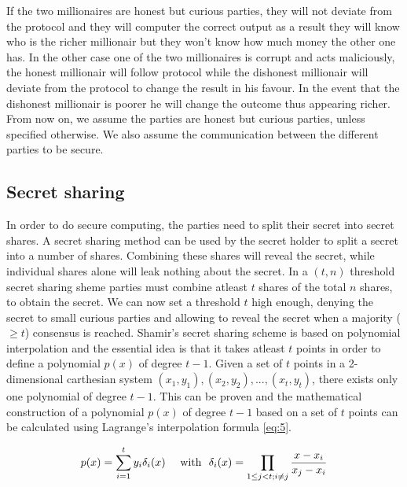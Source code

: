 If the two millionaires are honest but curious parties, they will not deviate from the protocol and they will computer the correct output as a result they will know who is the richer millionair but they won't know how much money the other one has. In the other case one of the two millionaires is corrupt and acts maliciously, the honest millionair will follow protocol while the dishonest millionair will deviate from the protocol to change the result in his favour. In the event that the dishonest millionair is poorer he will change the outcome thus appearing richer.
From now on, we assume the parties are honest but curious parties, unless specified otherwise. We also assume the communication between the different parties to be secure.

\subsection{Secret sharing}
In order to do secure computing, the parties need to split their secret into secret shares. A secret sharing method can be used by the secret holder to split a secret into a number of shares. Combining these shares will reveal the secret, while individual shares alone will leak nothing about the secret. In a $(t,n)$ threshold secret sharing sheme parties must combine atleast $t$ shares of the total $n$ shares, to obtain the secret. We can now set a threshold $t$ high enough, denying the secret to small curious parties and allowing to reveal the secret when a majority ($\geq t$) consensus is reached. Shamir's secret sharing scheme \cite{shamir1979share} is based on polynomial interpolation and the essential idea is that it takes atleast $t$ points in order to define a polynomial $p(x)$ of degree $t-1$. Given a set of $t$ points in a 2-dimensional carthesian system  $(x_1, y_1), (x_2, y_2), ..., (x_t,y_t)$, there exists only one polynomial of degree $t-1$. This can be proven and the mathematical construction of a polynomial $p(x)$ of degree $t-1$ based on a set of $t$ points can be calculated using Lagrange's interpolation formula \ref{eq:5}.

\begin{equation} \label{eq:5}
\begin{aligned}
  p(x)= \sum_{i=1}^{t}y_{i}\delta_{i}(x)\text{\space\space\space\space with\space\space }\delta_{i}(x)=\prod_{1\leq j<t; i\neq j} \frac{x-x_i}{x_j-x_i}
\end{aligned}
\end{equation}

